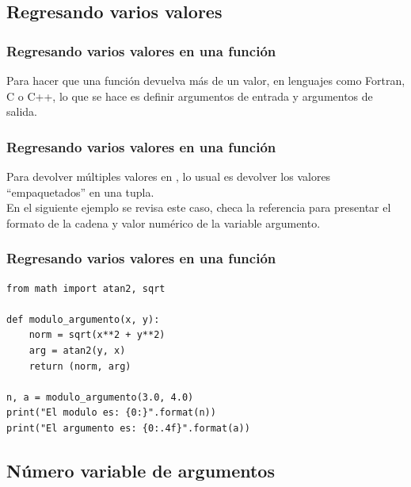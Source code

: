 \documentclass[12pt]{beamer}
\begin{document}
\subsection{Regresando varios valores}

\begin{frame}[fragile]
\frametitle{Regresando varios valores en una función}
Para hacer que una función devuelva más de un valor, en lenguajes como Fortran, C o C++, lo que se hace es definir argumentos de entrada y argumentos de salida.
\end{frame}
\begin{frame}[fragile]
\frametitle{Regresando varios valores en una función}
Para devolver múltiples valores en \python, lo usual es devolver los valores \enquote{empaquetados} en una tupla.
\\
\bigskip
\pause
En el siguiente ejemplo se revisa este caso, checa la referencia para presentar el formato de la cadena y valor numérico de la variable argumento.
\end{frame}
\begin{frame}[fragile]
\frametitle{Regresando varios valores en una función}
\begin{lstlisting}[caption=Devolviendo varios valores, basicstyle=\linespread{1.2}\ttfamily\small, columns=fullflexible,escapeinside=||]
from math import atan2, sqrt

def modulo_argumento(x, y):
    norm = sqrt(x**2 + y**2)
    arg = atan2(y, x)
    return (norm, arg)
    
n, a = modulo_argumento(3.0, 4.0)
print("El modulo es: {0:}".format(n))
print("El argumento es: {0:.4f}".format(a))
\end{lstlisting}
\end{frame}

\subsection{Número variable de argumentos}
\end{document}
